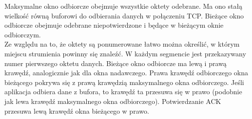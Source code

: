 \documentclass[../main.tex]{subfiles}
\begin{document}
    Maksymalne okno odbiorcze obejmuje wszystkie oktety odebrane. Ma ono stałą wielkość równą buforowi do
    odbierania danych w połączeniu TCP. Bieżące okno odbiorcze obejmuje odebrane niepotwierdzone i będące w bieżącym oknie odbiorczym. \\
    Ze względu na to, że oktety są ponumerowane łatwo można
    określić, w którym miejscu strumienia powinny się znaleźć. W każdym segmencie jest
    przekazywany numer pierwszego oktetu danych.
    Bieżące okno odbiorcze ma lewą i prawą krawędź, analogicznie jak dla okna nadawczego. Prawa krawędź odbiorczego okna bieżącego pokrywa się z prawą krawędzią maksymalnego okna odbiorczego. Jeśli aplikacja
    odbiera dane z bufora, to krawędź ta przesuwa się w prawo (podobnie jak lewa krawędź
    maksymalnego okna odbiorczego). Potwierdzanie ACK przesuwa lewą krawędź okna
    bieżącego w prawo.\\
\end{document}
